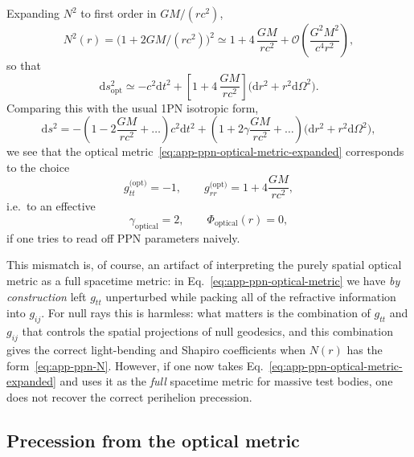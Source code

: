 \documentclass[11pt]{article}
\begin{document}
Expanding $N^2$ to first order in $GM/(r c^2)$,
\begin{equation}
  N^2(r)
  = \bigl(1 + 2GM/(r c^2)\bigr)^2
  \simeq 1 + 4\,\frac{GM}{r c^2}
  + \mathcal{O}\!\left(\frac{G^2M^2}{c^4 r^2}\right),
\end{equation}
so that
\begin{equation}
  \mathrm{d}s^2_{\text{opt}}
  \simeq -c^2 \mathrm{d}t^2
    + \left[1 + 4\,\frac{GM}{r c^2}\right]
      \bigl(\mathrm{d}r^2 + r^2 \mathrm{d}\Omega^2\bigr).
  \label{eq:app-ppn-optical-metric-expanded}
\end{equation}
Comparing this with the usual 1PN isotropic form,
\begin{equation}
  \mathrm{d}s^2
  = -\left(1 - 2\frac{GM}{r c^2} + \dots\right)c^2 \mathrm{d}t^2
    + \left(1 + 2\gamma\frac{GM}{r c^2} + \dots\right)
      \bigl(\mathrm{d}r^2 + r^2 \mathrm{d}\Omega^2\bigr),
  \label{eq:app-ppn-general-metric}
\end{equation}
we see that the optical metric~\eqref{eq:app-ppn-optical-metric-expanded}
corresponds to the choice
\begin{equation}
  g_{tt}^{\text{(opt)}} = -1,
  \qquad
  g_{rr}^{\text{(opt)}} = 1 + 4\frac{GM}{r c^2},
\end{equation}
i.e.\ to an effective
\begin{equation}
  \gamma_{\text{optical}}
  = 2,
  \qquad
  \Phi_{\text{optical}}(r) = 0,
\end{equation}
if one tries to read off PPN parameters naively.

This mismatch is, of course, an artifact of interpreting the purely
spatial optical metric as a full spacetime metric: in
Eq.~\eqref{eq:app-ppn-optical-metric} we have \emph{by construction} left
$g_{tt}$ unperturbed while packing all of the refractive information into
$g_{ij}$.
For null rays this is harmless: what matters is the combination of $g_{tt}$
and $g_{ij}$ that controls the spatial projections of null geodesics, and
this combination gives the correct light-bending and Shapiro coefficients
when $N(r)$ has the form~\eqref{eq:app-ppn-N}.
However, if one now takes Eq.~\eqref{eq:app-ppn-optical-metric-expanded}
and uses it as the \emph{full} spacetime metric for massive test bodies,
one does not recover the correct perihelion precession.


\subsection{Precession from the optical metric}
\label{subsec:app-optical-precession}
\end{document}
